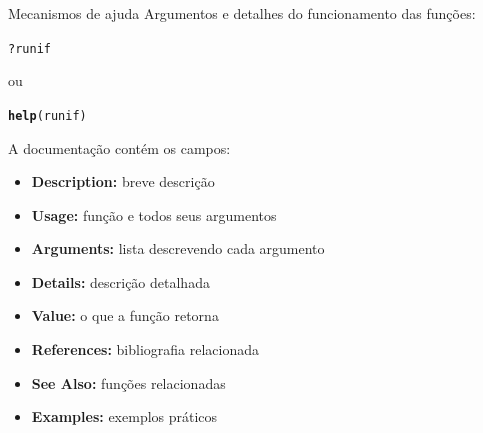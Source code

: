 \documentclass[10pt,handout]{beamer}\usepackage[]{graphicx}\usepackage[]{color}
\makeatletter
\newcommand{\hlopt}[1]{\textcolor[rgb]{0,0,0}{#1}}%
\newcommand{\hlstd}[1]{\textcolor[rgb]{0.345,0.345,0.345}{#1}}%
\newcommand{\hlkwd}[1]{\textcolor[rgb]{0.282,0.239,0.545}{\textbf{#1}}}%
\newenvironment{kframe}{%
 \def\at@end@of@kframe{}%
 \ifinner\ifhmode%
  \def\at@end@of@kframe{\end{minipage}}%
  \begin{minipage}{\columnwidth}%
 \fi\fi%
 \def\FrameCommand##1{\hskip\@totalleftmargin \hskip-\fboxsep
 \colorbox{shadecolor}{##1}\hskip-\fboxsep
     \hskip-\linewidth \hskip-\@totalleftmargin \hskip\columnwidth}%
 \MakeFramed {\advance\hsize-\width
   \@totalleftmargin\z@ \linewidth\hsize
   \@setminipage}}%
 {\par\unskip\endMakeFramed%
 \at@end@of@kframe}
\newenvironment{knitrout}{}{} %
\makeatother
\begin{document}
\begin{frame}[fragile]{Mecanismos de ajuda}
Argumentos e detalhes do funcionamento das funções:
\begin{knitrout}\small
{}\color{fgcolor}\begin{kframe}
\begin{alltt}
\hlopt{?}\hlstd{runif}
\end{alltt}
\end{kframe}
\end{knitrout}

ou
\begin{knitrout}\small
{}\color{fgcolor}\begin{kframe}
\begin{alltt}
\hlkwd{help}\hlstd{(runif)}
\end{alltt}
\end{kframe}
\end{knitrout}

A documentação contém os campos:
\begin{itemize}
\item \textbf{Description:} breve descrição
\item \textbf{Usage:} função e todos seus argumentos
\item \textbf{Arguments:} lista descrevendo cada argumento
\item \textbf{Details:} descrição detalhada
\item \textbf{Value:} o que a função retorna
\item \textbf{References:} bibliografia relacionada
\item \textbf{See Also:} funções relacionadas
\item \textbf{Examples:} exemplos práticos
\end{itemize}
\end{frame}
\end{document}
